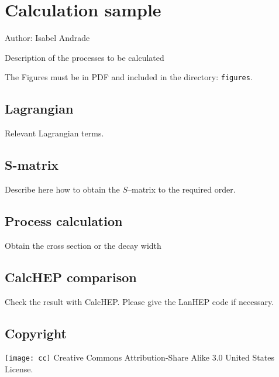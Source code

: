 \chapter{Calculation sample}

Author: Isabel Andrade

Description of the processes to be calculated

The Figures must be in PDF and included in the directory: \verb|figures|.

\section{Lagrangian}
Relevant Lagrangian terms.

\section{S-matrix}
Describe here how to obtain the $S$--matrix to the required order.

\section{Process calculation}
Obtain the cross section or the decay width

\section{CalcHEP comparison}
Check the result with CalcHEP. Please give the LanHEP code if necessary.


\section{Copyright}
\texttt{[image: cc]} Creative Commons Attribution-Share Alike 3.0 United States License.





